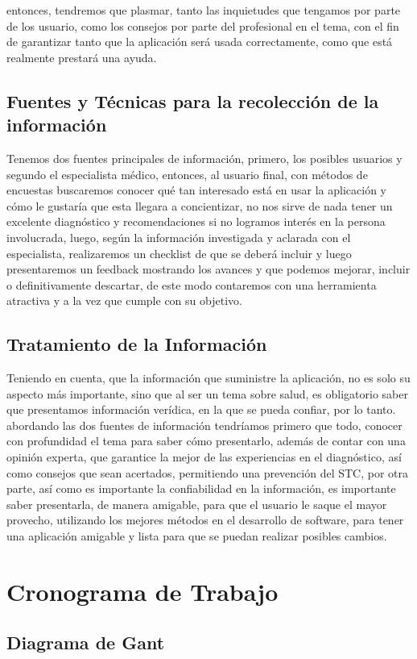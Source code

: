 \documentclass[a4paper,man,natbib]{apa6}
\begin{document}
entonces, tendremos que plasmar, tanto las inquietudes que tengamos por parte de los usuario, como los consejos por parte del profesional en el tema, con el fin de garantizar tanto que la aplicación será usada correctamente, como que está realmente prestará una ayuda.

\subsection{Fuentes y Técnicas para la recolección de la información}
Tenemos dos fuentes principales de información, primero, los posibles usuarios y segundo el especialista médico, entonces, al usuario final, con métodos de encuestas buscaremos conocer qué tan interesado está en usar la aplicación y cómo le gustaría que esta llegara a concientizar, no nos sirve de nada tener un excelente diagnóstico y recomendaciones si no logramos interés en la persona involucrada,   luego, según la información investigada y aclarada con el especialista, realizaremos un checklist de que se deberá incluir y luego presentaremos un feedback  mostrando los avances y que podemos mejorar, incluir o definitivamente descartar, de este modo contaremos con una herramienta atractiva y a la vez que cumple con su objetivo.

\subsection{Tratamiento de la Información}
Teniendo en cuenta, que la información que suministre la aplicación, no es solo su aspecto más importante, sino que al ser un tema sobre salud, es obligatorio saber que presentamos información verídica, en la que se pueda confiar, por lo tanto. abordando las dos fuentes de información tendríamos primero que todo, conocer con profundidad el tema para saber cómo presentarlo, además de contar  con una opinión experta, que garantice la mejor de las experiencias en el diagnóstico, así como  consejos que sean acertados, permitiendo una prevención del STC,   por otra parte, así como es importante la confiabilidad en la información, es importante saber presentarla, de manera amigable, para que el usuario le saque el mayor provecho, utilizando los mejores métodos en  el desarrollo de software, para tener una aplicación amigable y lista para que se puedan realizar posibles cambios.

\section{Cronograma de Trabajo}
\subsection{Diagrama de Gant}




\end{document}
